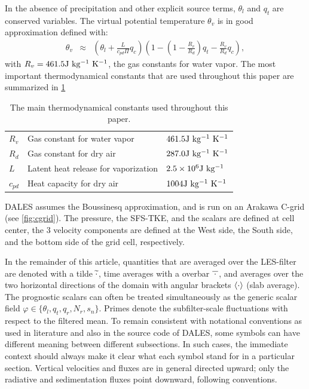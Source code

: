  In the absence of precipitation and other explicit source terms, $\theta_l$ and $q_t$ are conserved variables. The virtual potential temperature $\theta_v$ is in good approximation defined with:
\begin{eqnarray}
\theta_v&\approx&\left(\theta_l+\frac{L}{c_{pd}\Pi}q_c\right)\left(1-\left(1-\frac{R_v}{R_d}\right)q_t-\frac{R_v}{R_d}q_c\right),
\end{eqnarray}
with $R_v=461.5 \mathrm{J\ kg^{-1}\ K^{-1}}$, the gas constants  for water vapor. The most important thermodynamical constants that are used throughout this paper are summarized in \tabnm \ref{tab:gov_thermoconst}
\begin{table}
\begin{center}
\begin{tabular}{|l|l|l|}
\hline
$R_v$ &Gas constant for water vapor&   $461.5 \mr{J\ kg^{-1}\ K^{-1}}$ \\
$R_d$ &Gas constant for dry air&   $287.0 \mr{J\ kg^{-1}\ K^{-1}}$ \\
$L$ &Latent heat release for vaporization&   $2.5\times10^6\mathrm{J\ kg^{-1}}$ \\
$c_{pd}$ &Heat capacity for dry air&   $1004\mr{J\ kg^{-1}\ K^{-1}}$ \\
\hline
\end{tabular}
\end{center}
\caption{\label{tab:gov_thermoconst} The main thermodynamical constants used throughout this paper.}
\end{table}

DALES assumes the Boussinesq approximation, and is run on an Arakawa C-grid (see \fignm \ref{fig:cgrid}). The pressure, the SFS-TKE, and the scalars are defined at cell center, the 3 velocity components are defined at the West side, the South side, and the bottom side of the grid cell, respectively.

In the remainder of this article, quantities that are averaged over the LES-filter are denoted with a tilde $\widetilde{\cdot}$, time averages with a overbar $\overline{\hspace{0.5ex}\cdot\hspace{0.5ex}}$, and averages over the two horizontal directions of the domain with angular brackets $\left\langle{\cdot}\right\rangle$ (slab average). The prognostic scalars can often be treated simultaneously as the generic scalar field $\varphi \in\{ \theta_l, q_t, q_r,N_r,s_n\}$.  Primes denote the subfilter-scale fluctuations with respect to the filtered mean. To remain consistent with notational conventions as used in literature and also in the source code of DALES, some symbols can have different meaning between different subsections. In such cases, the immediate context should always make it clear what each symbol stand for in a particular section. Vertical velocities and fluxes are in general directed upward; only the radiative and sedimentation fluxes point downward, following conventions.

